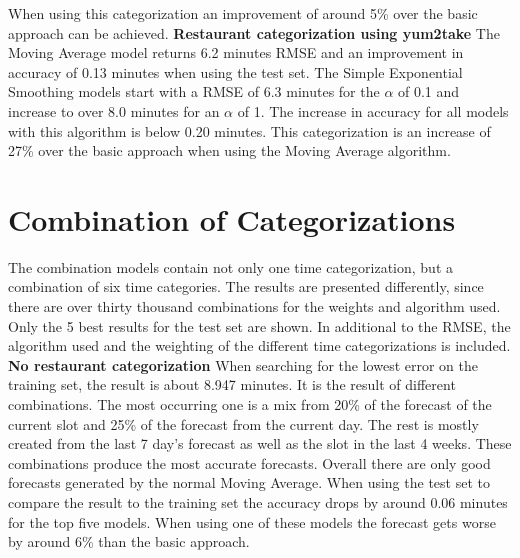 When using this categorization an improvement of around 5\% over the basic approach can be achieved.
\newline\newline\textbf{Restaurant categorization using yum2take}\newline
The Moving Average model returns 6.2 minutes RMSE and an improvement in accuracy of 0.13 minutes when using the test set. The Simple Exponential Smoothing models start with a RMSE of 6.3 minutes for the $\alpha$ of 0.1 and increase to over 8.0 minutes for an $\alpha$ of 1. The increase in accuracy for all models with this algorithm is below 0.20 minutes.\newline
This categorization is an increase of 27\% over the basic approach when using the Moving Average algorithm.
\section{Combination of Categorizations}\label{section:Combination of Categorizations}
The combination models contain not only one time categorization, but a combination of six time categories.
The results are presented differently, since there are over thirty thousand combinations for the weights and algorithm used. Only the 5 best results for the test set are shown. In additional to the RMSE, the algorithm used and the weighting of the different time categorizations is included.
\newline\newline\textbf{No restaurant categorization}\newline
When searching for the lowest error on the training set, the result is about 8.947 minutes. It is the result of different combinations. The most occurring one is a mix from 20\% of the forecast of the current slot and 25\% of the forecast from the current day. The rest is mostly created from the last 7 day's forecast as well as the slot in the last 4 weeks. These combinations produce the most accurate forecasts. Overall there are only good forecasts generated by the normal Moving Average. When using the test set to compare the result to the training set the accuracy drops by around 0.06 minutes for the top five models.\newline
When using one of these models the forecast gets worse by around 6\% than the basic approach.
